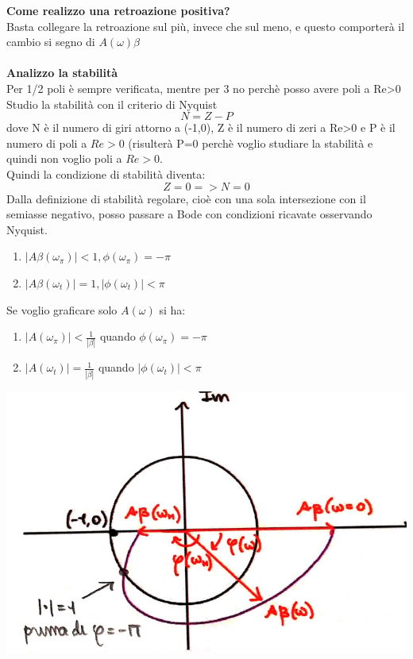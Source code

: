 \documentclass{article}
\begin{document}
\textbf{Come realizzo una retroazione positiva?} \\
Basta collegare la retroazione sul più, invece che sul meno, e questo comporterà il cambio si segno di $
    A(\omega)\beta $ \\ \\
\textbf{Analizzo la stabilità} \\
Per 1/2 poli è sempre verificata, mentre per 3 no perchè posso avere poli a Re>0 \\
Studio la stabilità con il criterio di Nyquist \\
\begin{equation}
    N=Z-P
\end{equation}
dove N è il numero di giri attorno a (-1,0), Z è il numero di zeri a Re>0 e P è il numero di poli a $
    Re>0
$ (risulterà P=0 perchè voglio studiare la stabilità e quindi non voglio poli a $
    Re>0
$.\\
Quindi la condizione di stabilità diventa:
\begin{equation}
    Z=0 => N=0
\end{equation}
Dalla definizione di stabilità regolare, cioè con una sola intersezione con il semiasse negativo, posso passare a Bode con condizioni ricavate osservando Nyquist.
\begin{enumerate}
    \item $ |A\beta(\omega_{\pi})|<1 ,   \phi(\omega_{\pi})=-\pi $
    \item $|A\beta(\omega_{t})|=1 ,   |\phi(\omega_{t})|<\pi$
\end{enumerate}
Se voglio graficare solo $A(\omega)$ si ha:
\begin{enumerate}
    \item $ |A(\omega_{\pi})|<\frac{1}{|\beta|} $ quando $ \phi(\omega_{\pi})=-\pi$
    \item $|A(\omega_{t})|=\frac{1}{|\beta|} $  quando $ |\phi(\omega_{t})|<\pi$
\end{enumerate}
\vspace{4mm}
\begin{center}
    \includegraphics[scale=0.6]{Nyquist.png}
\end{center} 
\vspace{4mm}
\end{document}
